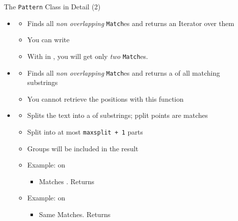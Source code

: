 \begin{frame}{The \texttt{Pattern} Class in Detail (2)}
%
\begin{itemize}
\item {}
	\begin{itemize}
	\item Finds all \emph{non overlapping} \texttt{Match}es and returns an Iterator over them
	\item[\Thus] You can write 
	\item[\Thus] With  in , you will get only \emph{two} \texttt{Match}es.
	\end{itemize}
\pause
\item {}
	\begin{itemize}
	\item Finds all \emph{non overlapping} \texttt{Match}es and returns a  of all matching substrings
	\item You cannot retrieve the positions with this function
	\end{itemize}
\pause
\item {}
	\begin{itemize}
	\item Splits the text into a  of substrings; pplit points are matches
	\item Split into at most \texttt{maxsplit + 1} parts
	\item Groups will be included in the result
	\item Example:  on 
		\begin{itemize}
		\item Matches . Returns 
		\end{itemize}
	\item Example:  on 
		\begin{itemize}
		\item Same Matches. Returns 
		\end{itemize}
	\end{itemize}
\end{itemize}
%
\end{frame}


